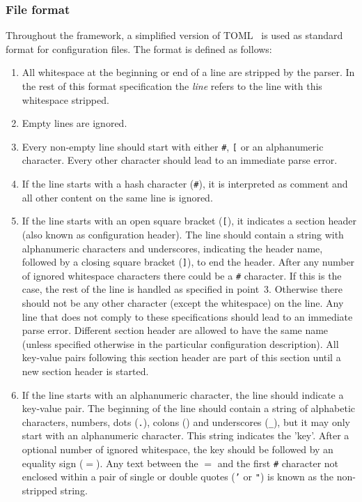 \subsubsection{File format}
\label{sec:config_file_format}
Throughout the framework, a simplified version of TOML~\cite{tomlgit} is used as standard format for configuration files.
The format is defined as follows:
\begin{enumerate}
\item All whitespace at the beginning or end of a line are stripped by the parser.
In the rest of this format specification the \textit{line} refers to the line with this whitespace stripped.
\item Empty lines are ignored.
\item Every non-empty line should start with either \texttt{\#}, \texttt{[} or an alphanumeric character.
Every other character should lead to an immediate parse error.
\item If the line starts with a hash character (\texttt{\#}), it is interpreted as comment and all other content on the same line is ignored.
\item If the line starts with an open square bracket (\texttt{[}), it indicates a section header (also known as configuration header).
The line should contain a string with alphanumeric characters and underscores, indicating the header name, followed by a closing square bracket (\texttt{]}), to end the header.
After any number of ignored whitespace characters there could be a \texttt{\#} character.
If this is the case, the rest of the line is handled as specified in point~3.
Otherwise there should not be any other character (except the whitespace) on the line.
Any line that does not comply to these specifications should lead to an immediate parse error.
Different section header are allowed to have the same name (unless specified otherwise in the particular configuration description).
All key-value pairs following this section header are part of this section until a new section header is started.
\item If the line starts with an alphanumeric character, the line should indicate a key-value pair.
The beginning of the line should contain a string of alphabetic characters, numbers, dots (\texttt{.}), colons (\texttt{\:}) and underscores (\texttt{\_}), but it may only start with an alphanumeric character.
This string indicates the 'key'.
After a optional number of ignored whitespace, the key should be followed by an equality sign (\texttt{$=$}).
Any text between the \texttt{$=$} and the first \texttt{\#} character not enclosed within a pair of single or double quotes (\texttt{'} or \texttt{"}) is known as the non-stripped string.

\end{enumerate}
